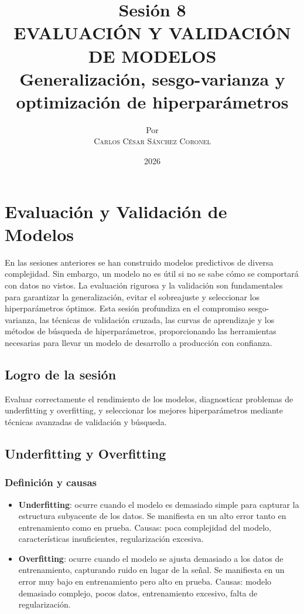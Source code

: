 \documentclass[12pt,a4paper,openany,oneside]{book}
\title{
    \textbf{Sesión 8} \\ 
    \Huge \textbf{EVALUACIÓN Y VALIDACIÓN DE MODELOS} \\
    \Large Generalización, sesgo-varianza y optimización de hiperparámetros
}
\author{
    \small Por \\ \vspace{0.2cm}
    \Large \textsc{Carlos César Sánchez Coronel}
}
\date{2026}
\begin{document}
\maketitle
\tableofcontents
{}

\chapter{Evaluación y Validación de Modelos}

En las sesiones anteriores se han construido modelos predictivos de diversa complejidad. Sin embargo, un modelo no es útil si no se sabe cómo se comportará con datos no vistos. La evaluación rigurosa y la validación son fundamentales para garantizar la generalización, evitar el sobreajuste y seleccionar los hiperparámetros óptimos. Esta sesión profundiza en el compromiso sesgo-varianza, las técnicas de validación cruzada, las curvas de aprendizaje y los métodos de búsqueda de hiperparámetros, proporcionando las herramientas necesarias para llevar un modelo de desarrollo a producción con confianza.

\section{Logro de la sesión}
Evaluar correctamente el rendimiento de los modelos, diagnosticar problemas de underfitting y overfitting, y seleccionar los mejores hiperparámetros mediante técnicas avanzadas de validación y búsqueda.

\section{Underfitting y Overfitting}

\subsection{Definición y causas}
\begin{itemize}
    \item \textbf{Underfitting}: ocurre cuando el modelo es demasiado simple para capturar la estructura subyacente de los datos. Se manifiesta en un alto error tanto en entrenamiento como en prueba. Causas: poca complejidad del modelo, características insuficientes, regularización excesiva.
    \item \textbf{Overfitting}: ocurre cuando el modelo se ajusta demasiado a los datos de entrenamiento, capturando ruido en lugar de la señal. Se manifiesta en un error muy bajo en entrenamiento pero alto en prueba. Causas: modelo demasiado complejo, pocos datos, entrenamiento excesivo, falta de regularización.
\end{itemize}
\end{document}
